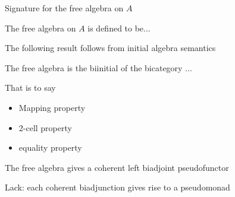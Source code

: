\cite{lynge2019}

\begin{definition}
Signature for the free algebra on $A$

The free algebra on $A$ is defined to be...
\end{definition}

The following result follows from initial algebra semantics

\begin{corollary}
The free algebra is the biinitial of the bicategory ...

That is to say
\begin{itemize}
	\item Mapping property
	\item 2-cell property
	\item equality property
\end{itemize} 
\end{corollary}



\begin{proposition}
The free algebra gives a coherent left biadjoint pseudofunctor
\end{proposition}





\begin{proposition}
Lack: each coherent biadjunction gives rise to a pseudomonad

\cite{lack2000coherent}
\end{proposition}